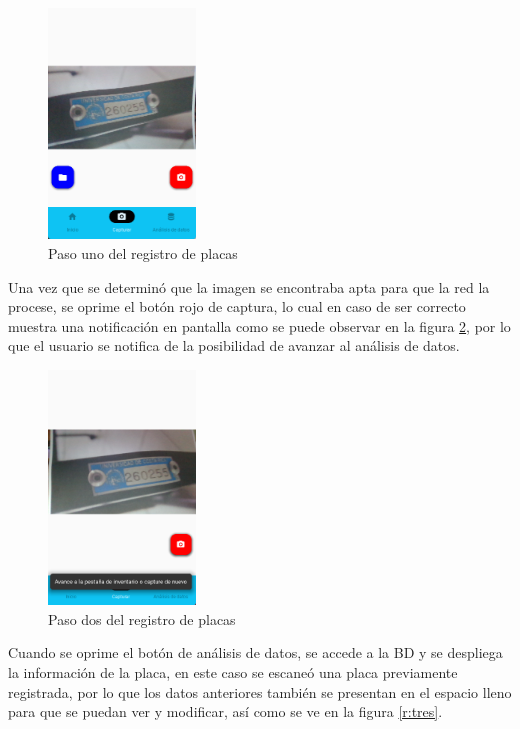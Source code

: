 \begin{figure}[ht]
    \centering
    \includegraphics[width=0.35\textwidth]{imagenes/resultados/uno.png}
    \caption{Paso uno del registro de placas}
    \label{r:uno}
\end{figure}
\par
Una vez que se determinó que la imagen se encontraba apta para que la red la procese, se oprime el botón rojo de captura, lo cual en caso de ser correcto muestra una notificación en pantalla como se puede observar en la figura \ref{r:dos}, por lo que el usuario se notifica de la posibilidad de avanzar al análisis de datos.
\begin{figure}[ht]
    \centering
    \includegraphics[width=0.35\textwidth]{imagenes/resultados/dos.png}
    \caption{Paso dos del registro de placas}
    \label{r:dos}
\end{figure}
\par
Cuando se oprime el botón de análisis de datos, se accede a la BD y se despliega la información de la placa, en este caso se escaneó una placa previamente registrada, por lo que los datos anteriores también se presentan en el espacio lleno para que se puedan ver y modificar, así como se ve en la figura \ref{r:tres}.
